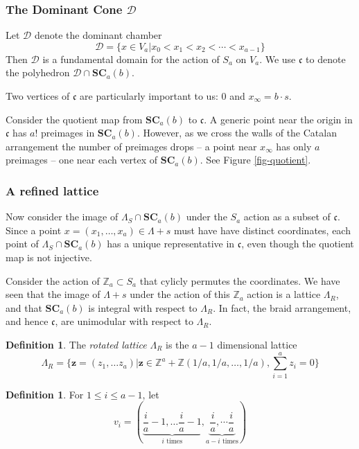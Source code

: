 \documentclass{amsart}[12pt]
\theoremstyle{definition}
\newtheorem{definition}[dummy]{Definition}
\newcommand{\Z}{\mathbb{Z}}
\newcommand{\SC}{\mathbf{SC}}
\newcommand{\polyh}{\mathfrak{c}}
\newcommand{\dominant}{\mathcal{D}}
\begin{document}
\subsubsection{The Dominant Cone $\dominant$}

Let $\dominant$ denote the dominant chamber $$\dominant=\{x\in V_a|x_0< x_1< x_2<\cdots < x_{a-1}\}$$
Then $\dominant$ is a fundamental domain for the action of $S_a$ on $V_a$.  We use $\polyh$ to denote the polyhedron $\dominant\cap\SC_{a}(b)$.  

Two vertices of $\polyh$ are particularly important to us: $0$ and  $x_\infty=b\cdot s$.

Consider the quotient map from $\SC_a(b)$ to $\polyh$.  A generic point near the origin in $\polyh$ has $a!$ preimages in $\SC_a(b)$.  However, as we cross the walls of the Catalan arrangement the number of preimages drops -- a point near $x_\infty$ has only $a$ preimages -- one near each vertex of $\SC_a(b)$. See Figure \ref{fig-quotient}.


\subsubsection{A refined lattice}

Now consider the image of $\Lambda_S\cap \SC_{a}(b)$ under the $S_a$ action as a subset of $\polyh$.   Since a point $x=(x_1,\dots,x_a)\in\Lambda+s$ must have have distinct coordinates, each point of $\Lambda_S\cap \SC_a(b)$ has a unique representative in $\polyh$, even though the quotient map is not injective.

Consider the action of $\Z_a\subset S_a$ that cylicly permutes the coordinates.  We have seen that the image of $\Lambda+s$ under the action of this $\Z_a$ action is a lattice $\Lambda_R$, and that $\SC_a(b)$ is integral with respect to $\Lambda_R$.  In fact, the braid arrangement, and hence $\polyh$, are unimodular with respect to $\Lambda_R$.  

\begin{definition} The \emph{rotated lattice} $\Lambda_R$ is the $a-1$ dimensional lattice
$$\Lambda_R=\{\mathbf{z}=(z_1,\dots z_a)|\mathbf{z}\in\Z^a+\mathbb{Z}(1/a,1/a,\dots, 1/a), \sum_{i=1}^a z_i=0\}$$
\end{definition}

\begin{definition}
For $1\leq i\leq a-1$, let $$v_i=\left(\underbrace{\frac{i}{a}-1,\dots \frac{i}{a}-1}_{i \text{ times}},\underbrace{ \frac{i}{a},\dotsm\frac{i}{a}}_{a-i \text{ times}}\right)$$
\end{definition}
\end{document}
